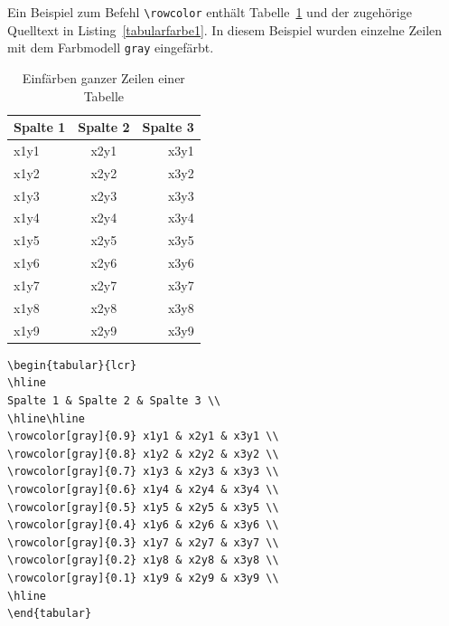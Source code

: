 \documentclass[a4paper,10pt,twoside]{scrbook}
\begin{document}
{Ein Beispiel zum Befehl \verb!\rowcolor! enthält Tabelle~\ref{Tabelle_Farbige_Zeilen1} und der zugehörige Quelltext in Listing~\ref{tabularfarbe1}. In diesem Beispiel wurden einzelne Zeilen mit dem Farbmodell \verb!gray! eingefärbt.  


\begin{table}[h!tb]
\centering
\caption{Einfärben ganzer Zeilen einer Tabelle}
\label{Tabelle_Farbige_Zeilen1}
\begin{tabular}{lcr}
\hline
Spalte 1 & Spalte 2 & Spalte 3 \\
\hline\hline
\rowcolor[gray]{0.9} x1y1 & x2y1 & x3y1 \\
\rowcolor[gray]{0.8} x1y2 & x2y2 & x3y2 \\
\rowcolor[gray]{0.7} x1y3 & x2y3 & x3y3 \\
\rowcolor[gray]{0.6} x1y4 & x2y4 & x3y4 \\
\rowcolor[gray]{0.5} x1y5 & x2y5 & x3y5 \\
\rowcolor[gray]{0.4} x1y6 & x2y6 & x3y6 \\
\rowcolor[gray]{0.3} x1y7 & x2y7 & x3y7 \\
\rowcolor[gray]{0.2} x1y8 & x2y8 & x3y8 \\
\rowcolor[gray]{0.1} x1y9 & x2y9 & x3y9 \\
\hline
\end{tabular}
\end{table}





\begin{lstlisting}[caption={Das Einfärben ganzer Zeilen einer Tabelle geschieht mit dem Befehl \texttt{rowcolor}},label=tabularfarbe1, style=customlatex]
\begin{tabular}{lcr}
\hline
Spalte 1 & Spalte 2 & Spalte 3 \\
\hline\hline
\rowcolor[gray]{0.9} x1y1 & x2y1 & x3y1 \\
\rowcolor[gray]{0.8} x1y2 & x2y2 & x3y2 \\
\rowcolor[gray]{0.7} x1y3 & x2y3 & x3y3 \\
\rowcolor[gray]{0.6} x1y4 & x2y4 & x3y4 \\
\rowcolor[gray]{0.5} x1y5 & x2y5 & x3y5 \\
\rowcolor[gray]{0.4} x1y6 & x2y6 & x3y6 \\
\rowcolor[gray]{0.3} x1y7 & x2y7 & x3y7 \\
\rowcolor[gray]{0.2} x1y8 & x2y8 & x3y8 \\
\rowcolor[gray]{0.1} x1y9 & x2y9 & x3y9 \\
\hline
\end{tabular}
\end{lstlisting}


}
\end{document}
